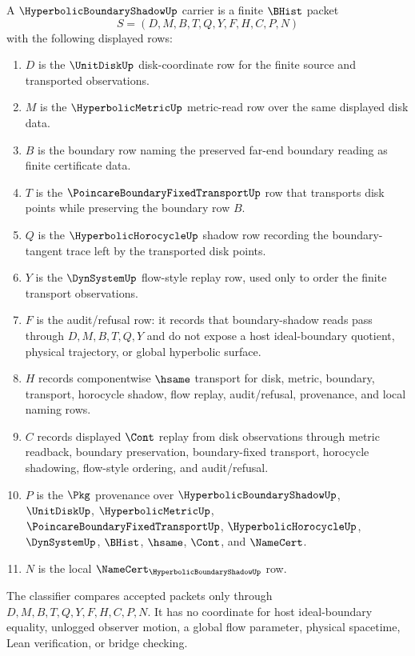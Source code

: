 \begin{definition}
\label{def:hyperbolic-boundary-shadow-carrier}
A $\HyperbolicBoundaryShadowUp$ carrier is a finite $\BHist$ packet
$$
S=(D,M,B,T,Q,Y,F,H,C,P,N)
$$
with the following displayed rows:
\begin{enumerate}
\item $D$ is the $\UnitDiskUp$ disk-coordinate row for the finite source and
transported observations.
\item $M$ is the $\HyperbolicMetricUp$ metric-read row over the same displayed
disk data.
\item $B$ is the boundary row naming the preserved far-end boundary reading as
finite certificate data.
\item $T$ is the $\PoincareBoundaryFixedTransportUp$ row that transports disk
points while preserving the boundary row $B$.
\item $Q$ is the $\HyperbolicHorocycleUp$ shadow row recording the
boundary-tangent trace left by the transported disk points.
\item $Y$ is the $\DynSystemUp$ flow-style replay row, used only to order the
finite transport observations.
\item $F$ is the audit/refusal row: it records that boundary-shadow reads pass
through $D,M,B,T,Q,Y$ and do not expose a host ideal-boundary quotient,
physical trajectory, or global hyperbolic surface.
\item $H$ records componentwise $\hsame$ transport for disk, metric, boundary,
transport, horocycle shadow, flow replay, audit/refusal, provenance, and local
naming rows.
\item $C$ records displayed $\Cont$ replay from disk observations through
metric readback, boundary preservation, boundary-fixed transport, horocycle
shadowing, flow-style ordering, and audit/refusal.
\item $P$ is the $\Pkg$ provenance over $\HyperbolicBoundaryShadowUp$,
$\UnitDiskUp$, $\HyperbolicMetricUp$, $\PoincareBoundaryFixedTransportUp$,
$\HyperbolicHorocycleUp$, $\DynSystemUp$, $\BHist$, $\hsame$, $\Cont$, and
$\NameCert$.
\item $N$ is the local $\NameCert_{\HyperbolicBoundaryShadowUp}$ row.
\end{enumerate}
The classifier compares accepted packets only through
$D,M,B,T,Q,Y,F,H,C,P,N$. It has no coordinate for host ideal-boundary equality,
unlogged observer motion, a global flow parameter, physical spacetime, Lean
verification, or bridge checking.
\end{definition}

